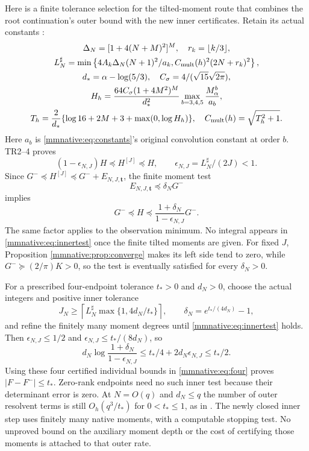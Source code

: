 Here is a finite tolerance selection for the tilted-moment route that
combines the root continuation's outer bound with the new inner
certificates.  Retain its actual constants \cite{mmnative:TR}:
\begin{equation}\label{mmnative:eq:Lsharp}
 \begin{gathered}
 \Delta_N=[1+4(N+M)^2]^M,\quad r_k=\lfloor k/3\rfloor,\\
 L_N^\sharp=\min\left\{4A_k\Delta_N(N+1)^2/a_k,
                  C_{\rm mult}(h)^2(2N+r_k)^2\right\},\\
 d_*=\alpha-\log(5/3),\quad C_\sigma=4/(\sqrt{15}\sqrt{2\pi}),\\
 H_h=\frac{64C_\sigma(1+4M^2)^M}{d_*^2}
                   \max_{b=3,4,5}\frac{M_\alpha^b}{a_b},\\
 T_h=\frac2{d_*}\{\log16+2M+3+\max(0,\log H_h)\},
 \quad C_{\rm mult}(h)=\sqrt{T_h^2+1}.
 \end{gathered}
\end{equation}
Here $a_b$ is \eqref{mmnative:eq:constants}'s original convolution constant
at order $b$.  TR2--4 proves
\begin{equation}\label{mmnative:eq:outerrelative}
 (1-\epsilon_{N,J})H\preceq H^{[J]}\preceq H,
 \qquad\epsilon_{N,J}=L_N^\sharp/(2J)<1.
\end{equation}
Since $G^-\preceq H^{[J]}\preceq G^-+E_{N,J,\mathbf t}$,
the finite moment test
\begin{equation}\label{mmnative:eq:innertest}
 E_{N,J,\mathbf t}\preceq\delta_NG^-
\end{equation}
implies
\begin{equation}\label{mmnative:eq:jointrelative}
 G^-\preceq H\preceq
 \frac{1+\delta_N}{1-\epsilon_{N,J}}G^-.
\end{equation}
The same factor applies to the observation minimum.  No integral
appears in \eqref{mmnative:eq:innertest} once the finite tilted moments are
given.  For fixed $J$, Proposition \ref{mmnative:prop:converge} makes its left
side tend to zero, while $G^-\succeq(2/\pi)K>0$, so the test is
eventually satisfied for every $\delta_N>0$.

For a prescribed four-endpoint tolerance $t_*>0$ and $d_N>0$, choose
the actual integers and positive inner tolerance
\begin{equation}\label{mmnative:eq:tolerance}
 J_N\ge\left\lceil L_N^\sharp\max\{1,4d_N/t_*\}\right\rceil,
 \qquad\delta_N=e^{t_*/(4d_N)}-1,
\end{equation}
and refine the finitely many moment degrees until \eqref{mmnative:eq:innertest}
holds.  Then $\epsilon_{N,J}\le1/2$ and
$\epsilon_{N,J}\le t_*/(8d_N)$, so
\[
 d_N\log\frac{1+\delta_N}{1-\epsilon_{N,J}}
 \le t_*/4+2d_N\epsilon_{N,J}\le t_*/2.
\]
Using these four certified individual bounds in \eqref{mmnative:eq:four}
proves $|F-F^-|\le t_*$.  Zero-rank endpoints need no such inner
test because their determinant error is zero.  At $N=O(q)$ and
$d_N\le q$ the number of outer resolvent terms is still
$O_h(q^3/t_*)$ for $0<t_*\le1$, as in \cite{mmnative:TR}.  The newly closed
inner step uses finitely many native moments, with a computable
stopping test.  No unproved bound on the auxiliary moment depth or
the cost of certifying those moments is attached to that outer rate.

